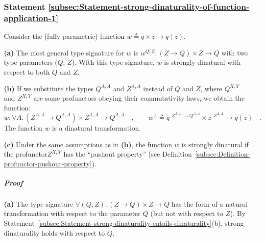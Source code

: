 \subsubsection{Statement \label{subsec:Statement-strong-dinaturality-of-function-application-1}\ref{subsec:Statement-strong-dinaturality-of-function-application-1}}

Consider the (fully parametric) function $w\triangleq q\times z\rightarrow q(z)$.

\textbf{(a)} The most general type signature for $w$ is $w^{Q,Z}:(Z\rightarrow Q)\times Z\rightarrow Q$
with two type parameters ($Q$, $Z$). With this type signature, $w$
is strongly dinatural with respect to both $Q$ and $Z$.

\textbf{(b)} If we substitute the types $Q^{A,A}$ and $Z^{A,A}$
instead of $Q$ and $Z$, where $Q^{X,Y}$ and $Z^{X,Y}$ are some
profunctors obeying their commutativity laws, we obtain the function:
\[
w:\forall A.\,(Z^{A,A}\rightarrow Q^{A,A})\times Z^{A,A}\rightarrow Q^{A,A}\quad,\quad\quad w^{A}\triangleq q^{:Z^{A,A}\rightarrow Q^{A,A}}\times z^{:Z^{A,A}}\rightarrow q(z)\quad.
\]
The function $w$ is a dinatural transformation.

\textbf{(c)} Under the same assumptions as in \textbf{(b)}, the function
$w$ is strongly dinatural if the profunctor$Z^{X,Y}$ has the \textsf{``}pushout
property\textsf{''} (see Definition~\ref{subsec:Definition-profunctor-pushout-property}).

\subparagraph{Proof}

\textbf{(a)} The type signature $\forall(Q,Z).\,(Z\rightarrow Q)\times Z\rightarrow Q$
has the form of a natural transformation with respect to the parameter
$Q$ (but not with respect to $Z$). By Statement~\ref{subsec:Statement-strong-dinaturality-entails-dinaturality}(b),
strong dinaturality holds with respect to $Q$. 

